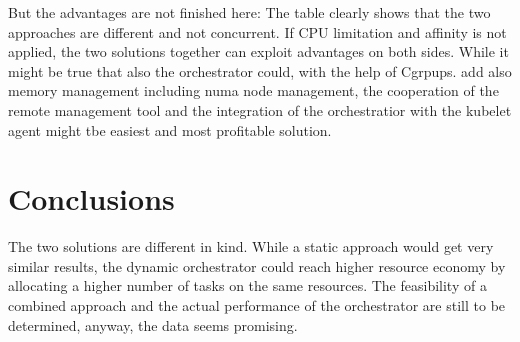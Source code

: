 \documentclass[]{scrartcl}
\begin{document}
But the advantages are not finished here: 
The table clearly shows that the two approaches are different and not concurrent. If CPU limitation and affinity is not applied, the two solutions together can exploit advantages on both sides. While it might be true that also the orchestrator could, with the help of Cgrpups. add also memory management including numa node management, the cooperation of the remote management tool and the integration of the orchestratior with the kubelet agent might tbe easiest and most profitable solution. 

\section{Conclusions}

The two solutions are different in kind. While a static approach would get very similar results, the dynamic orchestrator could reach higher resource economy by allocating a higher number of tasks on the same resources.
The feasibility of a combined approach and the actual performance of the orchestrator are still to be determined, anyway, the data seems promising.
\end{document}
